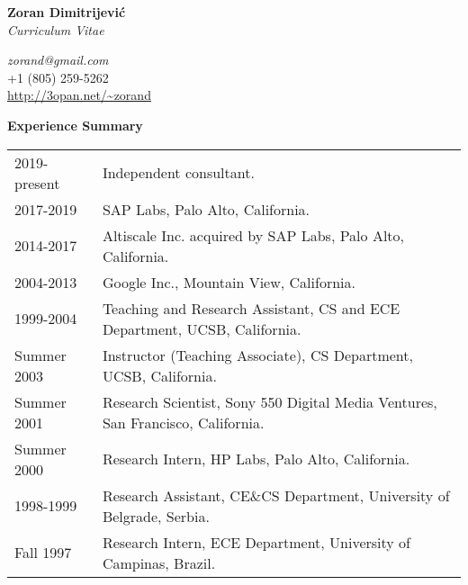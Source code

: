 \documentclass[10pt]{article}
\renewcommand{\section}[1]{ \vspace{10pt}\begin{flushleft}{\hspace{-0.2in }\Large\bf
    #1}\end{flushleft}\nopagebreak }
\begin{document}
\begin{center}
\vspace{-1.5in}
  {\Large\bf Zoran Dimitrijevi\'{c}}\\
  {\large\em Curriculum Vitae}
\end{center}

\begin{center}
{\em zorand@gmail.com}\\
+1 (805) 259-5262\\
\url{http://3opan.net/~zorand}
\end{center}

%

\vspace{-5pt}
\section{Experience Summary}

\begin{tabular}{ll}
2019-present    & Independent consultant.\\
2017-2019       & SAP Labs, Palo Alto, California.\\
2014-2017       & Altiscale Inc. acquired by SAP Labs, Palo Alto, California.\\
2004-2013       & Google Inc., Mountain View, California.\\
1999-2004	& Teaching and Research Assistant, 
			CS and ECE Department, UCSB, California. \\
Summer 2003	& Instructor (Teaching Associate), CS Department, UCSB, California. \\
Summer 2001	& Research Scientist, Sony 550 Digital Media Ventures, 
			San Francisco, California. \\
Summer 2000	& Research Intern, HP Labs, Palo Alto, California. \\
1998-1999	& Research Assistant, CE\&CS Department, University of Belgrade, Serbia.\\
Fall 1997	& Research Intern, ECE Department, University of Campinas, Brazil. \\
\end{tabular}
\end{document}
